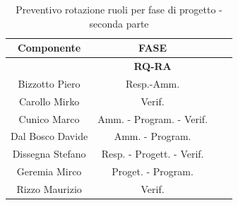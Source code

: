 \begin{table}[!h]
	\begin{center}
		  \begin{tabular}
			  {|c|c|c|c|}
			\hline
			\textbf{Componente} & \multicolumn{1}{|c|}{ \textbf{FASE} } \\
			\hline
			& \textbf{RQ-RA} \\
			\hline
			Bizzotto Piero & Resp.-Amm.   \\
			\hline
			Carollo Mirko & Verif.   \\
			\hline
			Cunico Marco & Amm. - Program. - Verif.  \\
			\hline
			Dal Bosco Davide & Amm. - Program.  \\
			\hline
			Dissegna Stefano & Resp. - Progett. - Verif.   \\
			\hline
			Geremia Mirco & Proget. - Program.   \\
			\hline
            Rizzo Maurizio  & Verif. \\
			\hline

		\end{tabular}
	\caption{Preventivo rotazione ruoli per fase di progetto - seconda parte} %
	\label{tab:TabellaRotazRuoliDue}
	\end{center}	
\end{table}
\newpage
{}

